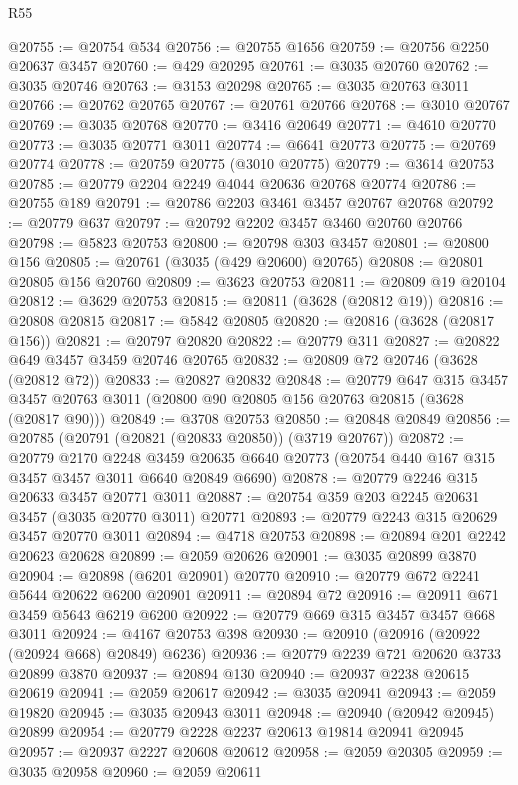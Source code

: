 \begin{lexlean}{R55}
\begin{coremodule}
@20755 := @20754 @534
@20756 := @20755 @1656
@20759 := @20756 @2250 @20637 @3457
@20760 := @429 @20295
@20761 := @3035 @20760
@20762 := @3035 @20746
@20763 := @3153 @20298
@20765 := @3035 @20763 @3011
@20766 := @20762 @20765
@20767 := @20761 @20766
@20768 := @3010 @20767
@20769 := @3035 @20768
@20770 := @3416 @20649
@20771 := @4610 @20770
@20773 := @3035 @20771 @3011
@20774 := @6641 @20773
@20775 := @20769 @20774
@20778 := @20759 @20775 (@3010 @20775)
@20779 := @3614 @20753
@20785 := @20779 @2204 @2249 @4044 @20636 @20768 @20774
@20786 := @20755 @189
@20791 := @20786 @2203 @3461 @3457 @20767 @20768
@20792 := @20779 @637
@20797 := @20792 @2202 @3457 @3460 @20760 @20766
@20798 := @5823 @20753
@20800 := @20798 @303 @3457
@20801 := @20800 @156
@20805 := @20761 (@3035 (@429 @20600) @20765)
@20808 := @20801 @20805 @156 @20760
@20809 := @3623 @20753
@20811 := @20809 @19 @20104
@20812 := @3629 @20753
@20815 := @20811 (@3628 (@20812 @19))
@20816 := @20808 @20815
@20817 := @5842 @20805
@20820 := @20816 (@3628 (@20817 @156))
@20821 := @20797 @20820
@20822 := @20779 @311
@20827 := @20822 @649 @3457 @3459 @20746 @20765
@20832 := @20809 @72 @20746 (@3628 (@20812 @72))
@20833 := @20827 @20832
@20848 := @20779
    @647
    @315
    @3457
    @3457
    @20763
    @3011
    (@20800 @90 @20805 @156 @20763 @20815 (@3628 (@20817 @90)))
@20849 := @3708 @20753
@20850 := @20848 @20849
@20856 := @20785 (@20791 (@20821 (@20833 @20850)) (@3719 @20767))
@20872 := @20779
    @2170
    @2248
    @3459
    @20635
    @6640
    @20773
    (@20754 @440 @167 @315 @3457 @3457 @3011 @6640 @20849 @6690)
@20878 := @20779 @2246 @315 @20633 @3457 @20771 @3011
@20887 := @20754 @359 @203 @2245 @20631 @3457 (@3035 @20770 @3011) @20771
@20893 := @20779 @2243 @315 @20629 @3457 @20770 @3011
@20894 := @4718 @20753
@20898 := @20894 @201 @2242 @20623 @20628
@20899 := @2059 @20626
@20901 := @3035 @20899 @3870
@20904 := @20898 (@6201 @20901) @20770
@20910 := @20779 @672 @2241 @5644 @20622 @6200 @20901
@20911 := @20894 @72
@20916 := @20911 @671 @3459 @5643 @6219 @6200
@20922 := @20779 @669 @315 @3457 @3457 @668 @3011
@20924 := @4167 @20753 @398
@20930 := @20910 (@20916 (@20922 (@20924 @668) @20849) @6236)
@20936 := @20779 @2239 @721 @20620 @3733 @20899 @3870
@20937 := @20894 @130
@20940 := @20937 @2238 @20615 @20619
@20941 := @2059 @20617
@20942 := @3035 @20941
@20943 := @2059 @19820
@20945 := @3035 @20943 @3011
@20948 := @20940 (@20942 @20945) @20899
@20954 := @20779 @2228 @2237 @20613 @19814 @20941 @20945
@20957 := @20937 @2227 @20608 @20612
@20958 := @2059 @20305
@20959 := @3035 @20958
@20960 := @2059 @20611

\end{coremodule}
\end{lexlean}
